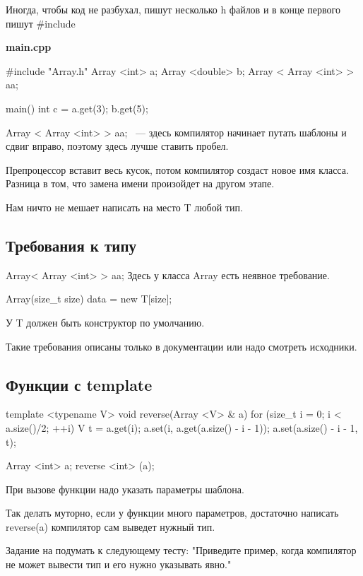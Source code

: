 Иногда, чтобы код не разбухал, пишут несколько h файлов и в конце первого пишут \#include

{\bf main.cpp}

\begin{cppcode}
#include "Array.h"
Array <int> a;
Array <double> b;
Array < Array <int> > aa; 

main() {
    int c = a.get(3);
    b.get(5);
}
\end{cppcode}

Array < Array <int> > aa; ~--- здесь компилятор начинает путать шаблоны и сдвиг вправо, поэтому здесь лучше ставить пробел. 

Препроцессор вставит весь кусок, потом компилятор создаст новое имя класса. Разница в том, что замена имени произойдет на другом этапе. 

Нам ничто не мешает написать на место T любой тип. 

\subsection{Требования к типу}

Array< Array <int> > aa; Здесь у класса Array есть неявное требование.
\begin{cppcode}
Array(size_t size) {
    data = new T[size];
} 
\end{cppcode}

У T должен быть конструктор по умолчанию.

Такие требования описаны только в документации или надо смотреть исходники.

\subsection{Функции с template}

\begin{cppcode}
template <typename V>
void reverse(Array <V> & a) {
    for (size_t i = 0; i < a.size()/2; ++i) {
        V t = a.get(i);
        a.set(i, a.get(a.size() - i - 1));
        a.set(a.size() - i - 1, t);
    }
} 

Array <int> a;
reverse <int> (a); 
\end{cppcode}

При вызове функции надо указать параметры шаблона. 

Так делать муторно, если у функции много параметров, достаточно написать reverse(a) компилятор сам выведет нужный тип. 

Задание на подумать к следующему тесту: "Приведите пример, когда компилятор не может вывести тип и его нужно указывать явно."

